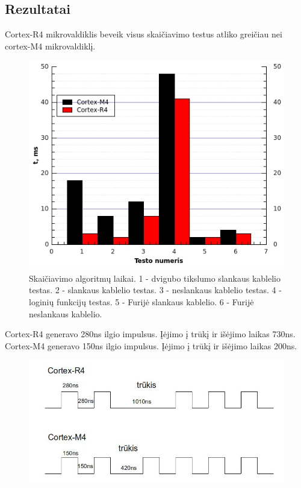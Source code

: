 \documentclass[a4paper, 12pt]{article} %
\begin{document}
\begin{onehalfspacing}
\section{Rezultatai}
Cortex-R4 mikrovaldiklis beveik visus skai\v{c}iavimo testus atliko grei\v{c}iau nei cortex-M4 mikrovaldikl\k{i}. 
\begin{figure}[H] %
\centering %
\includegraphics[scale=0.8]{pav/testai.jpg} %
\captionsetup{labelformat=numbfirst} %
\captionsetup{labelseparator=tarpas}
\caption{Skai\v{c}iavimo algoritm\k{u} laikai. 1 - dvigubo tikslumo slankaus kablelio testas. 2 - slankaus kablelio testas. 3 - neslankaus kablelio testas. 4 - logini\k{u} funkcij\k{u} testas. 5 - Furij\.e slankaus kablelio. 6 - Furij\.e neslankaus kablelio.}
\label{vienas}
\end{figure}
Cortex-R4 generavo 280ns ilgio impulsus. \k{I}\.ejimo \k{i} tr\=uk\k{i} ir i\v{s}\.ejimo laikas 730ns. Cortex-M4 generavo 150ns ilgio impulsus. \k{I}\.ejimo \k{i} tr\=uk\k{i} ir i\v{s}\.ejimo laikas 200ns.
\begin{figure}[H] %
\centering %
\includegraphics[scale=0.4]{pav/trukiai.jpg} %

\end{figure}
\end{onehalfspacing}
\end{document}

